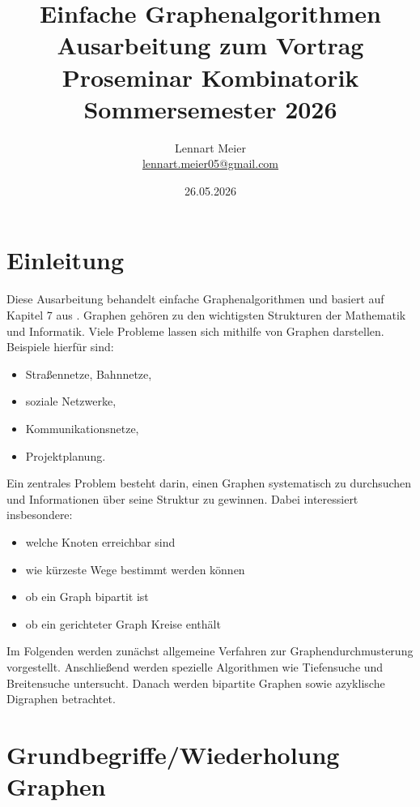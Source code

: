 \documentclass[12pt]{article}
\title{
Einfache Graphenalgorithmen\\[0.5em]
\Large Ausarbeitung zum Vortrag\\
Proseminar Kombinatorik\\
Sommersemester 2026
}
\author{
Lennart Meier\\
\url{lennart.meier05@gmail.com}
}
\date{26.05.2026}
\begin{document}
\maketitle
\thispagestyle{empty}

\newpage


\tableofcontents

\newpage


\section{Einleitung}

Diese Ausarbeitung behandelt einfache Graphenalgorithmen und basiert auf Kapitel 7 aus \cite{hougardy2018}. 
Graphen gehören zu den wichtigsten Strukturen der Mathematik und Informatik. Viele Probleme lassen sich mithilfe von Graphen darstellen. Beispiele hierfür sind:

\begin{itemize}
    \item Straßennetze, Bahnnetze,
    \item soziale Netzwerke,
    \item Kommunikationsnetze,
    \item Projektplanung.
\end{itemize}

Ein zentrales Problem besteht darin, einen Graphen systematisch zu durchsuchen und Informationen über seine Struktur zu gewinnen. Dabei interessiert insbesondere:

\begin{itemize}
    \item welche Knoten erreichbar sind
    \item wie kürzeste Wege bestimmt werden können
    \item ob ein Graph bipartit ist
    \item ob ein gerichteter Graph Kreise enthält
\end{itemize}
Im Folgenden werden zunächst allgemeine Verfahren zur Graphendurchmusterung vorgestellt. Anschließend werden spezielle Algorithmen wie Tiefensuche und Breitensuche untersucht. Danach werden bipartite Graphen sowie azyklische Digraphen betrachtet.

\section{Grundbegriffe/Wiederholung Graphen}
\end{document}
